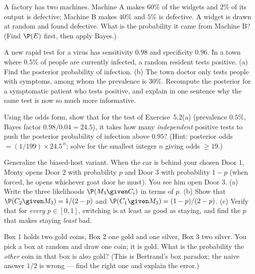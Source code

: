 \begin{exercise}
A factory has two machines. Machine A makes $60\%$ of the widgets and $2\%$ of its output
is defective; Machine B makes $40\%$ and $5\%$ is defective. A widget is drawn at random
and found defective. What is the probability it came from Machine B? (Find $\P(E)$ first,
then apply Bayes.)
\end{exercise}

\begin{exercise}
A new rapid test for a virus has sensitivity $0.98$ and specificity $0.96$. In a town
where $0.5\%$ of people are currently infected, a random resident tests positive. (a) Find
the posterior probability of infection. (b) The town doctor only tests people with
symptoms, among whom the prevalence is $30\%$. Recompute the posterior for a symptomatic
patient who tests positive, and explain in one sentence why the same test is now so much
more informative.
\end{exercise}

\begin{exercise}
Using the odds form, show that for the test of Exercise~5.2(a) (prevalence $0.5\%$,
Bayes factor $0.98/0.04 = 24.5$), it takes how many \emph{independent} positive tests to
push the posterior probability of infection above $0.95$? (Hint: posterior odds $=
(1/199)\times 24.5^{\,n}$; solve for the smallest integer $n$ giving odds $\ge 19$.)
\end{exercise}

\begin{exercise}
Generalize the biased-host variant. When the car is behind your chosen Door $1$, Monty
opens Door $2$ with probability $p$ and Door $3$ with probability $1-p$ (when forced, he
opens whichever goat door he must). You see him open Door $3$. (a) Write the three
likelihoods $\P(M_3\given C_i)$ in terms of $p$. (b) Show that
$\P(C_2\given M_3) = 1/(2-p)$ and $\P(C_1\given M_3) = (1-p)/(2-p)$. (c) Verify that for
\emph{every} $p\in[0,1]$, switching is at least as good as staying, and find the $p$ that
makes staying \emph{least} bad.
\end{exercise}

\begin{exercise}
Box 1 holds two gold coins, Box 2 one gold and one silver, Box 3 two silver. You pick a
box at random and draw one coin; it is gold. What is the probability the \emph{other}
coin in that box is also gold? (This is Bertrand's box paradox; the naive answer $1/2$ is
wrong --- find the right one and explain the error.)
\end{exercise}

